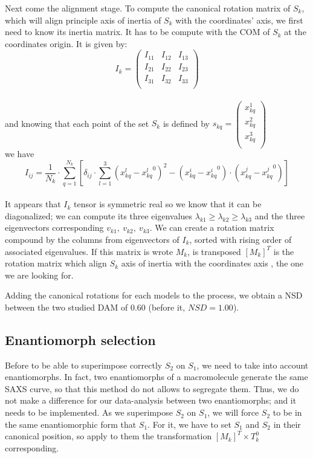 \documentclass[a4paper, 11pt]{report}
\begin{document}
Next come the alignment stage. 
To compute the canonical rotation matrix of $S_{k}$, which will align 
principle axis of inertia of $S_{k}$ with the coordinates' axis, we 
first need to know its inertia matrix. 
It has to be compute with the COM of $S_{k}$ at the coordinates origin. 
It is given by:
\[
I_{k}=
\begin{pmatrix}
 I_{11} & I_{12} & I_{13} \\
 I_{21} & I_{22} & I_{23} \\
 I_{31} & I_{32} & I_{33} \\
\end{pmatrix}
\]\\
and knowing that each point of the set $S_{k}$ is defined by
$
s_{kq}=
\begin{pmatrix}
 x_{kq}^1 \\
 x_{kq}^2 \\
 x_{kq}^3 \\
\end{pmatrix}
$\\
we have
\[
I_{ij} = \frac{1}{N_{k}} \cdot \sum\limits_{q=1}^{N_{k}} 
[\delta_{ij} \cdot \sum\limits_{l=1}^3 
 (x_{kq}^l - {x_{kq}^l}^0)^2 -  (x_{kq}^i - {x_{kq}^i}^0) 
 \cdot (x_{kq}^j - {x_{kq}^j}^0)]
\]\\
It appears that $I_{k}$ tensor is symmetric real so we know that it 
can be diagonalized; we can compute its three eigenvalues 
$\lambda_{k1} \geq \lambda_{k2} \geq \lambda_{k3}$ and the three 
eigenvectors corresponding $v_{k1},\ v_{k2},\ v_{k3}$. 
We can create a rotation matrix compound by the columns from 
eigenvectors of $I_{k}$, sorted with rising order of associated 
eigenvalues. 
If this matrix is wrote $M_{k}$, is transposed $[M_{k}]^T$ is the 
rotation matrix which align $S_{k}$ axis of inertia with the 
coordinates axis \cite{supcomb}, the one we are looking for.

Adding the canonical rotations for each models to the process, we 
obtain a NSD between the two studied DAM of $0.60$ (before it, 
$NSD = 1.00$).

\subsection{Enantiomorph selection}

Before to be able to superimpose correctly $S_{2}$ on $S_{1}$, we need 
to take into account enantiomorphs. 
In fact, two enantiomorphs of a macromolecule generate the same SAXS 
curve, so that this method do not allows to segregate them. 
Thus, we do not make a difference for our data-analysis between two 
enantiomorphs; and it needs to be implemented. 
As we superimpose $S_{2}$ on $S_{1}$, we will force $S_{2}$ to be in 
the same enantiomorphic form that $S_{1}$. 
For it, we have to set $S_{1}$ and $S_{2}$ in their canonical 
position, so apply to them the transformation 
$[M_{k}]^T \times T_{k}^0$ corresponding.
\end{document}
